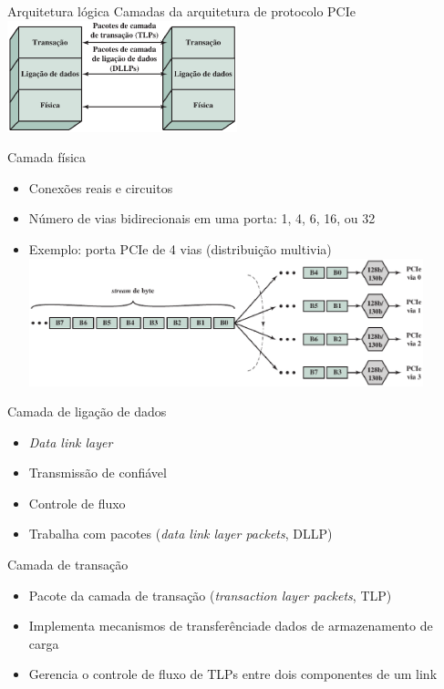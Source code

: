\begin{slide}{Arquitetura lógica}
Camadas da arquitetura de protocolo PCIe\\
   \centering
   \includegraphics[width=0.5\textwidth]{figs/3-22}
\end{slide}

\begin{slide}{Camada física}
	\begin{itemize}
		\item Conexões reais e circuitos
		\item Número de vias bidirecionais em uma porta: 1, 4, 6, 16, ou 32
		\item Exemplo: porta PCIe de 4 vias (distribuição multivia)
			\centering
			\includegraphics[width=0.9\textwidth]{figs/3-23}
	\end{itemize}
\end{slide}

\begin{slide}{Camada de ligação de dados}
	\begin{itemize}
		\item \textit{Data link layer}
		\item Transmissão de confiável
		\item Controle de fluxo
		\item Trabalha com pacotes (\textit{data link layer packets}, DLLP)
	\end{itemize}
\end{slide}

\begin{slide}{Camada de transação}
	\begin{itemize}
		\item Pacote da camada de transação (\textit{transaction layer packets}, TLP)
		\item Implementa mecanismos de transferênciade dados de armazenamento de carga
		\item Gerencia o controle de fluxo de TLPs entre dois componentes de um link
	\end{itemize}
\end{slide}

